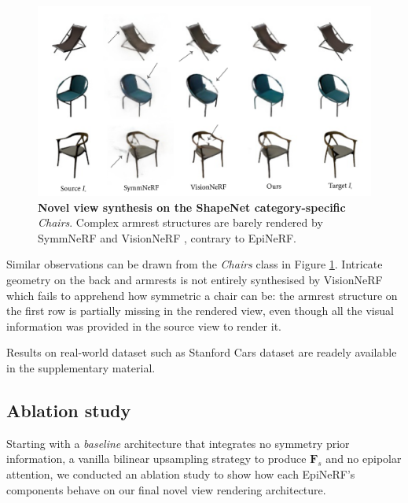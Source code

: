 \begin{figure}[h!]
    \begin{center}
  \includegraphics[width=\linewidth]{images/epinerf/chairs_BMVC.png}
  \end{center}
  \caption{\textbf{Novel view synthesis on the ShapeNet category-specific} \textit{Chairs}. Complex armrest structures are barely rendered by SymmNeRF \citep{li2022symmnerf} and VisionNeRF \citep{lin2023vision}, contrary to EpiNeRF. }
  \label{fig:exp-srn-chairs}
\end{figure}
 Similar observations can be drawn from the \textit{Chairs} class in Figure \ref{fig:exp-srn-chairs}. Intricate geometry on the back and armrests is not entirely synthesised by VisionNeRF  which fails to apprehend how symmetric a chair can be: the armrest structure on the first row is partially missing in the rendered view, even though all the visual information was provided in the source view to render it. 

 Results on real-world dataset such as Stanford Cars dataset \citep{krause20133d} are readely available in the supplementary material. 

\subsection{Ablation study}
Starting with a \textit{baseline} architecture that integrates no symmetry prior information, a vanilla bilinear upsampling strategy to produce $\mathbf{F}_{s}$ and no epipolar attention, we conducted an ablation study to show how each EpiNeRF's components behave on our final novel view rendering architecture. 


